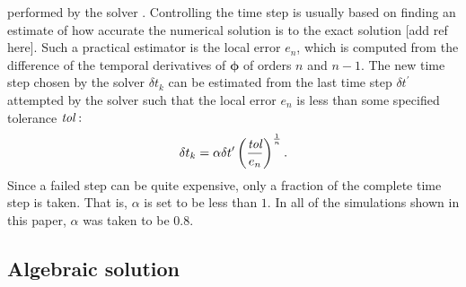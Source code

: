 \documentclass[aps,preprint]{revtex4}
\begin{document}
performed by the solver \cite{Shampine}. Controlling the time step is usually
based on finding an estimate of how accurate the numerical solution is to the
exact solution [add ref here]. Such a practical estimator is the local error
$e_{n}$, which is computed from the difference of the temporal derivatives of
$\mathbf{\phi}$ of orders $n$ and $n-1$. The new time step chosen by the
solver $\delta t _{k} $ can be estimated from the last time step $\delta t
^{\prime}$ attempted by the solver such that the local error $e_{n}$ is less
than some specified tolerance $\emph{tol}:$%
\begin{equation}
\delta t _{k}=\alpha\delta t ^{\prime}\left(  \frac{\emph{tol}}{e_{n}}\right)
^{\frac{1}{n}}.
\end{equation}
Since a failed step can be quite expensive, only a fraction of the complete
time step is taken. That is, $\alpha$ is set to be less than $1$. In all of
the simulations shown in this paper, $\alpha$ was taken to be $0.8$.

\subsection{Algebraic solution}
\end{document}
